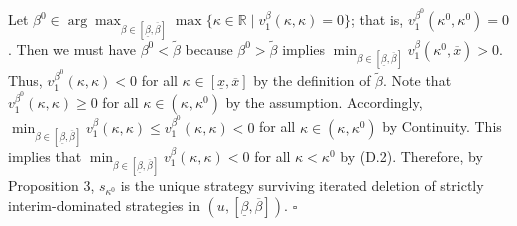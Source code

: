 \documentclass[12pt,a4paper]{article}
\newenvironment{original}
  {\par\medskip\noindent\color{black}\ignorespaces}
  {\par\medskip}
\theoremstyle{definition}
\theoremstyle{remark}
\begin{document}
\begin{original}
Let $\beta^0 \in \arg\max_{\beta \in [\underline{\beta}, \overline{\beta}]} \max\{\kappa \in \mathbb{R} \mid v_1^\beta(\kappa, \kappa) = 0\}$; that is, $v_1^{\beta^0}(\kappa^0, \kappa^0) = 0$. Then we must have $\beta^0 < \tilde{\beta}$ because $\beta^0 > \tilde{\beta}$ implies $\min_{\beta \in [\underline{\beta}, \overline{\beta}]} v_1^\beta(\kappa^0, \overline{x}) > 0$. Thus, $v_1^{\beta^0}(\kappa, \kappa) < 0$ for all $\kappa \in [\underline{x}, \overline{x}]$ by the definition of $\tilde{\beta}$. Note that $v_1^{\beta^0}(\kappa, \kappa) \ge 0$ for all $\kappa \in (\kappa, \kappa^0)$ by the assumption. Accordingly, $\min_{\beta \in [\underline{\beta}, \overline{\beta}]} v_1^\beta(\kappa, \kappa) \le v_1^{\beta^0}(\kappa, \kappa) < 0$ for all $\kappa \in (\kappa, \kappa^0)$ by Continuity. This implies that $\min_{\beta \in [\underline{\beta}, \overline{\beta}]} v_1^\beta(\kappa, \kappa) < 0$ for all $\kappa < \kappa^0$ by (D.2). Therefore, by Proposition 3, $s_{\kappa^0}$ is the unique strategy surviving iterated deletion of strictly interim-dominated strategies in $(u, [\underline{\beta}, \overline{\beta}])$. $\square$
\end{original}
\end{document}
